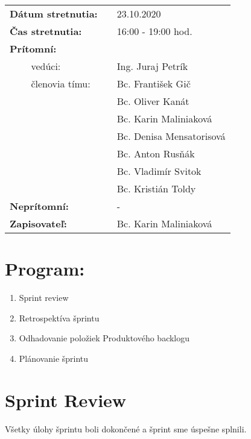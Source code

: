 \documentclass{article}
\begin{document}
    

    \begin{table}[h]
        \begin{tabular}{lllll}
            \multicolumn{3}{l}{\textbf{Dátum stretnutia:}} & & 23.10.2020 \\
            \multicolumn{3}{l}{\textbf{Čas stretnutia:}} & & 16:00 - 19:00 hod. \\
            \multicolumn{3}{l}{\textbf{Prítomní:}} \\
            & & vedúci: & & Ing. Juraj Petrík \\
            & & členovia tímu: & & Bc. František Gič  \\
            & & & & Bc. Oliver Kanát \\
            & & & & Bc. Karin Maliniaková \\
            & & & & Bc. Denisa Mensatorisová \\
            & & & & Bc. Anton Rusňák \\
            & & & & Bc. Vladimír Svitok \\
            & & & & Bc. Kristián Toldy \\
            \multicolumn{3}{l}{\textbf{Neprítomní:}} & & -\\
            \multicolumn{3}{l}{\textbf{Zapisovateľ:}} & & Bc. Karin Maliniaková \\
        \end{tabular}
        \label{tab:grades}
    \end{table}

    \section*{Program:}

    \begin{enumerate}
        \item Sprint review
        \item Retrospektíva šprintu
        \item Odhadovanie položiek Produktového backlogu
        \item Plánovanie šprintu
    \end{enumerate}

    \section*{Sprint Review}

    \textnormal Všetky úlohy šprintu boli dokončené a šprint sme úspešne splnili. 
\end{document}
